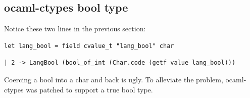 \documentclass{article}
\begin{document}
\subsection{ocaml-ctypes bool type}
Notice these two lines in the previous section:

\begin{lstlisting}[language=caml]
let lang_bool = field cvalue_t "lang_bool" char
\end{lstlisting}
\begin{lstlisting}[language=caml]
  | 2 -> LangBool (bool_of_int (Char.code (getf value lang_bool)))
\end{lstlisting}

Coercing a bool into a char and back is ugly. To alleviate the
problem, ocaml-ctypes was patched to support a true bool type.
\end{document}
